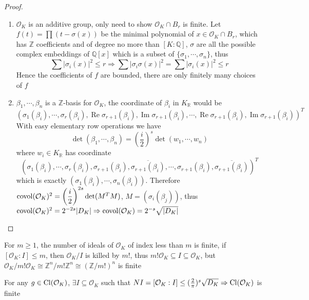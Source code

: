\documentclass[../main.tex]{subfiles}
\begin{document}
\begin{proof}
\begin{enumerate}
\item $\mathcal O_K$ is an additive group, only need to show $\mathcal O_K\cap B_r$ is finite. Let $f(t)=\prod(t-\sigma(x))$ be the minimal polynomial of $x\in\mathcal O_K\cap B_r$, which has $\mathbb Z$ coefficients and of degree no more than $[K:\mathbb Q]$, $\sigma$ are all the possible complex embeddings of $\mathbb Q[x]$ which is a subset of $\{\sigma_1,\cdots,\sigma_n\}$, thus \[\sum|\sigma_i(x)|^2\leq r\Rightarrow\sum|\sigma_i\sigma(x)|^2=\sum|\sigma_i(x)|^2\leq r\] Hence the coefficients of $f$ are bounded, there are only finitely many choices of $f$
\item $\beta_1,\cdots,\beta_n$ is a $\mathbb Z$-basis for $\mathcal O_K$, the coordinate of $\beta_i$ in $K_{\mathbb R}$ would be \[(\sigma_1(\beta_i),\cdots,\sigma_r(\beta_i),\operatorname{Re}\sigma_{r+1}(\beta_i),\operatorname{Im}\sigma_{r+1}(\beta_i),\cdots,\operatorname{Re}\sigma_{r+1}(\beta_i),\operatorname{Im}\sigma_{r+1}(\beta_i))^T\] With easy elementary row operations we have \[\det(\beta_1,\cdots,\beta_n)=\left(\frac{i}{2}\right)^s\det(w_1,\cdots,w_n)\]where $w_i\in K_{\mathbb R}$ has coordinate \[(\sigma_1(\beta_i),\cdots,\sigma_r(\beta_i),\sigma_{r+1}(\beta_i),\overline{\sigma_{r+1}(\beta_i)},\cdots,\sigma_{r+1}(\beta_i),\overline{\sigma_{r+1}(\beta_i)})^T\]which is exactly $(\sigma_1(\beta_i),\cdots,\sigma_n(\beta_i))$. Therefore $\operatorname{covol}(\mathcal O_K)^2=\left(\dfrac{i}{2}\right)^{2s}\det(M^TM)$, $M=(\sigma_i(\beta_j))$, thus $\operatorname{covol}(\mathcal O_K)^2=2^{-2s}|D_K|\Rightarrow\operatorname{covol}(\mathcal O_K)=2^{-s}\sqrt{|D_K|}$
\end{enumerate}
\end{proof}

\begin{lemma}
For $m\geq1$, the number of ideals of $\mathcal O_K$ of index less than $m$ is finite, if $[\mathcal O_K:I]\leq m$, then $\mathcal O_K/I$ is killed by $m!$, thus $m!\mathcal O_K\subseteq I\subseteq\mathcal O_K$, but $\mathcal O_K/m!\mathcal O_K\cong\mathbb Z^n/m!\mathbb Z^n\cong(\mathbb Z/m!)^n$ is finite
\end{lemma}

\begin{theorem}
For any $g\in \operatorname{Cl}(\mathcal O_K)$, $\exists I\subseteq \mathcal O_K$ such that $NI=[\mathcal O_K:I]\leq(\frac{2}{\pi})^s\sqrt{D_K}\Rightarrow \operatorname{Cl}(\mathcal O_K)$ is finite
\end{theorem}
\end{document}
